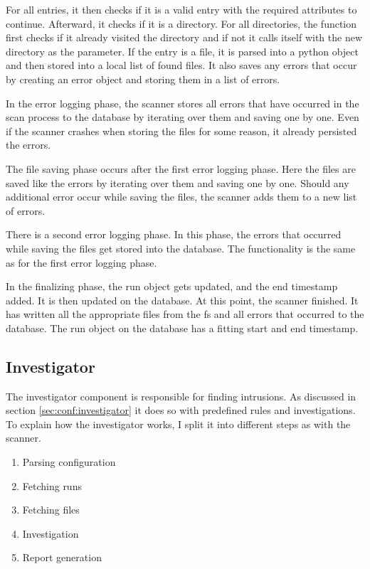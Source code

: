 For all entries, it then checks if it is a valid entry with the required attributes to continue. Afterward, it checks if it is a directory. For all directories, the function first checks if it already visited the directory and if not it calls itself with the new directory as the parameter. If the entry is a file, it is parsed into a python object and then stored into a local list of found files. It also saves any errors that occur by creating an error object and storing them in a list of errors.

In the error logging phase, the scanner stores all errors that have occurred in the scan process to the database by iterating over them and saving one by one. Even if the scanner crashes when storing the files for some reason, it already persisted the errors.

The file saving phase occurs after the first error logging phase. Here the files are saved like the errors by iterating over them and saving one by one. Should any additional error occur while saving the files, the scanner adds them to a new list of errors. 

There is a second error logging phase. In this phase, the errors that occurred while saving the files get stored into the database. The functionality is the same as for the first error logging phase.

In the finalizing phase, the run object gets updated, and the end timestamp added. It is then updated on the database. At this point, the scanner finished. It has written all the appropriate files from the \gls{fs} and all errors that occurred to the database. The run object on the database has a fitting start and end timestamp. 


\subsection{Investigator}
\label{sec:Investigator}

The investigator component is responsible for finding \glspl{intrusion}. As discussed in section \ref{sec:conf:investigator} it does so with predefined rules and investigations. To explain how the investigator works, I split it into different steps as with the scanner.

\begin{enumerate}
    \item Parsing configuration
    \item Fetching runs
    \item Fetching files
    \item Investigation
    \item Report generation
\end{enumerate}

